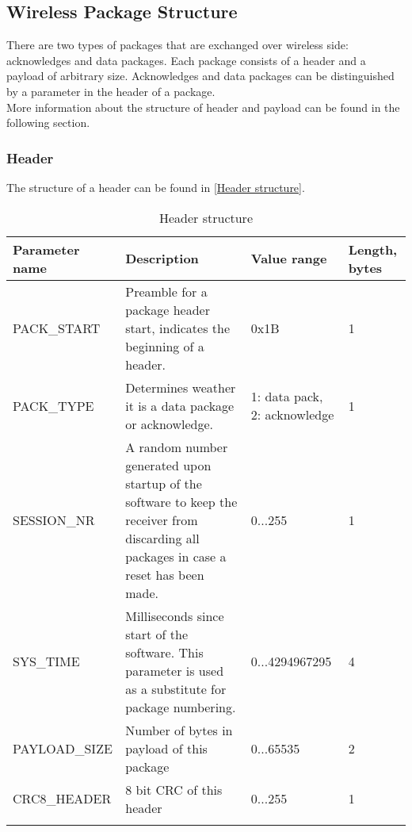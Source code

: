 \subsection{Wireless Package Structure}
There are two types of packages that are exchanged over wireless side: acknowledges and data packages. Each package consists of a header and a payload of arbitrary size. Acknowledges and data packages can be distinguished by a parameter in the header of a package. \\
More information about the structure of header and payload can be found in the following section.
\subsubsection{Header}
The structure of a header can be found in \autoref{Header structure}. \\
%
\begin{center}
    \begin{longtable}{p{3cm}p{8cm}p{2cm}p{1cm}}
        \hline
        \textbf{Parameter name} & \textbf{Description} & \textbf{Value range} & \textbf{Length, bytes} \\
        \hline
        PACK\_START & Preamble for a package header start, indicates the beginning of a header. & 0x1B & 1\\
        \hline
        PACK\_TYPE &  Determines weather it is a data package or acknowledge. & 1: data pack, 2: acknowledge & 1\\
        \hline
        SESSION\_NR &  A random number generated upon startup of the software to keep the receiver from discarding all packages in case a reset has been made. & 0...255 & 1\\
        \hline
        SYS\_TIME &  Milliseconds since start of the software. This parameter is used as a substitute for package numbering. & 0...4294967295 & 4\\
        \hline
        PAYLOAD\_SIZE &  Number of bytes in payload of this package & 0...65535 & 2\\
        \hline
        CRC8\_HEADER &  8 bit CRC of this header & 0...255 & 1\\
        \hline
        \caption{Header structure}
        \label{Header structure}    
    \end{longtable}
\end{center}
